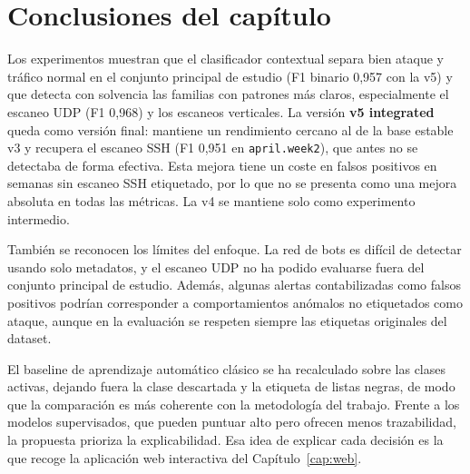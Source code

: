 \section{Conclusiones del capítulo}
\label{sec:exp_conclusion}

Los experimentos muestran que el clasificador contextual separa bien ataque y tráfico normal en el conjunto principal de estudio (F1 binario 0,957 con la v5) y que detecta con solvencia las familias con patrones más claros, especialmente el escaneo UDP (F1 0,968) y los escaneos verticales. La versión \textbf{v5 integrated} queda como versión final: mantiene un rendimiento cercano al de la base estable v3 y recupera el escaneo SSH (F1 0,951 en \texttt{april.week2}), que antes no se detectaba de forma efectiva. Esta mejora tiene un coste en falsos positivos en semanas sin escaneo SSH etiquetado, por lo que no se presenta como una mejora absoluta en todas las métricas. La v4 se mantiene solo como experimento intermedio.

También se reconocen los límites del enfoque. La red de bots es difícil de detectar usando solo metadatos, y el escaneo UDP no ha podido evaluarse fuera del conjunto principal de estudio. Además, algunas alertas contabilizadas como falsos positivos podrían corresponder a comportamientos anómalos no etiquetados como ataque, aunque en la evaluación se respeten siempre las etiquetas originales del dataset.

El baseline de aprendizaje automático clásico se ha recalculado sobre las clases activas, dejando fuera la clase descartada y la etiqueta de listas negras, de modo que la comparación es más coherente con la metodología del trabajo. Frente a los modelos supervisados, que pueden puntuar alto pero ofrecen menos trazabilidad, la propuesta prioriza la explicabilidad. Esa idea de explicar cada decisión es la que recoge la aplicación web interactiva del Capítulo~\ref{cap:web}.
